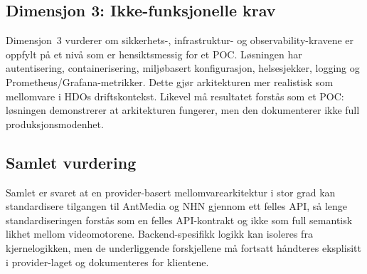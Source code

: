 \subsection{Dimensjon 3: Ikke-funksjonelle krav}
\label{sec:dim-nf-krav}

Dimensjon~3 vurderer om sikkerhets-, infrastruktur- og observability-kravene
er oppfylt på et nivå som er hensiktsmessig for et POC. Løsningen har
autentisering, containerisering, miljøbasert konfigurasjon, helsesjekker,
logging og Prometheus/Grafana-metrikker. Dette gjør arkitekturen mer
realistisk som mellomvare i HDOs driftskontekst. Likevel må resultatet
forstås som et POC: løsningen demonstrerer at arkitekturen fungerer, men den
dokumenterer ikke full produksjonsmodenhet.

\subsection{Samlet vurdering}

Samlet er svaret at en provider-basert mellomvarearkitektur i stor grad kan
standardisere tilgangen til AntMedia og NHN gjennom ett felles API, så lenge
standardiseringen forstås som en felles API-kontrakt og ikke som full
semantisk likhet mellom videomotorene. Backend-spesifikk logikk kan isoleres
fra kjernelogikken, men de underliggende forskjellene må fortsatt håndteres
eksplisitt i provider-laget og dokumenteres for klientene.

